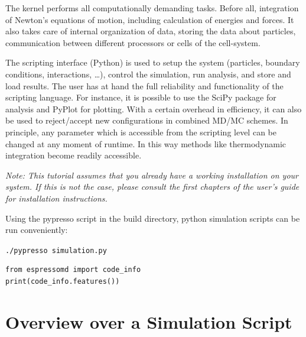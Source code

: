 \documentclass[
paper=a4,                       %
fontsize=11pt,                  %
twoside,                        %
footsepline,                    %
headsepline,                    %
headinclude=false,              %
footinclude=false,              %
pagesize,                       %
]{scrartcl}
\newtheorem{task}{Task}
\begin{document}
The kernel performs all computationally demanding tasks. Before all,
integration of Newton's equations of motion, including calculation of
energies and forces. It also takes care of internal organization of
data, storing the data about particles, communication between
different processors or cells of the cell-system. 

The scripting interface (Python) is used to setup the system (particles, boundary conditions,
interactions, \dots), control the simulation, run analysis, and store and load results.
The user has at hand the full reliability and functionality of the scripting language.
For instance, it is possible to use the SciPy package for analysis and PyPlot for plotting.
With a certain overhead in efficiency, it can also be
used to reject/accept new configurations in combined MD/MC schemes. In
principle, any parameter which is accessible from the scripting level can be
changed at any moment of runtime. In this way methods like
thermodynamic integration become readily accessible.

\emph{Note: This tutorial assumes that you already have a working \es{}
installation on your system. If this is not the case, please consult the first
chapters of the user's guide for installation instructions.}


Using the pypresso script in the build directory, python simulation scripts can be run conveniently:

\vspace{0,2cm}
\noindent\texttt{./pypresso simulation.py}

\vspace{1cm}\vspace{1cm}

\begin{lstlisting}
from espressomd import code_info
print(code_info.features())
\end{lstlisting}


\section{Overview over a Simulation Script}
\end{document}
